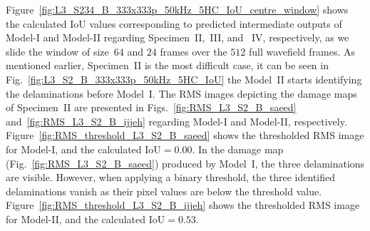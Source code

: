 \begin{sloppypar}
%	
%	
%	
%	
	Figure~\ref{fig:L3_S234_B_333x333p_50kHz_5HC_IoU_centre_window} shows the calculated IoU values corresponding to predicted intermediate outputs of Model-I and Model-II regarding Specimen~II,~III, and ~IV, respectively, as we slide the window of size~\(64\) and \(24\) frames over the \(512\) full wavefield frames.
	As mentioned earlier, Specimen~II is the most difficult case, it can be seen in Fig.~\ref{fig:L3_S2_B_333x333p_50kHz_5HC_IoU} the Model~II starts identifying the delaminations before Model~I.
	The RMS images depicting the damage maps of Specimen~II are presented in Figs.~\ref{fig:RMS_L3_S2_B_saeed} and~\ref{fig:RMS_L3_S2_B_ijjeh} regarding Model-I and Model-II, respectively.
	Figure~\ref{fig:RMS_threshold_L3_S2_B_saeed} shows the thresholded RMS image for Model-I, and the calculated IoU\(=0.00\).
	In the damage map (Fig.~\ref{fig:RMS_L3_S2_B_saeed}) produced by Model~I, the three delaminations are visible.
	However, when applying a binary threshold, the three identified delaminations vanish as their pixel values are below the threshold value. 
	Figure~\ref{fig:RMS_threshold_L3_S2_B_ijjeh} shows the thresholded RMS image for Model-II, and the calculated IoU\(=0.53\).
	

\end{sloppypar}
